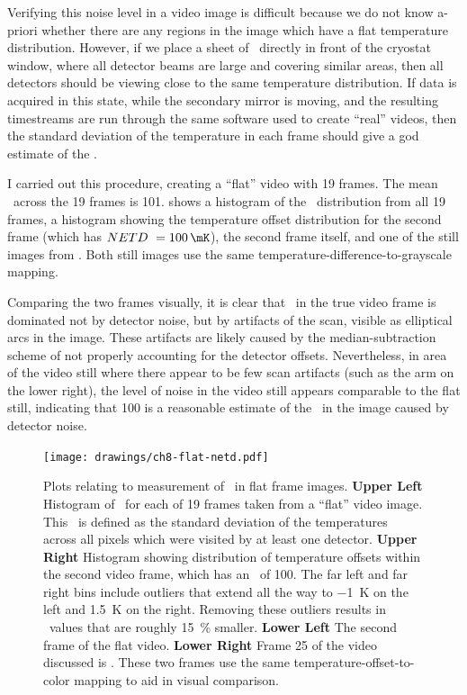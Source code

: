 Verifying this noise level in a video image is difficult because we do not know a-priori whether there are any regions in the image which have a flat temperature distribution.
However, if we place a sheet of \ecco\ directly in front of the cryostat window, where all detector beams are large and covering similar areas, then all detectors should be viewing close to the same temperature distribution.
If data is acquired in this state, while the secondary mirror is moving, and the resulting timestreams are run through the same software used to create ``real'' videos, then the standard deviation of the temperature in each frame should give a god estimate of the \NETD.

I carried out this procedure, creating a ``flat'' video with 19 frames.
The mean \NETD\ across the 19 frames is \SI{101}{\mK}.
 shows a histogram of the \NETD\ distribution from all 19 frames, a histogram showing the temperature offset distribution for the second frame (which has $\NETD\ = \SI{100}{\mK}$), the second frame itself, and one of the still images from .
Both still images use the same temperature-difference-to-grayscale mapping.

Comparing the two frames visually, it is clear that \NETD\ in the true video frame is dominated not by detector noise, but by artifacts of the scan, visible as elliptical arcs in the image.
These artifacts are likely caused by the median-subtraction scheme of  not properly accounting for the detector offsets.
Nevertheless, in area of the video still where there appear to be few scan artifacts (such as the arm on the lower right), the level of noise in the video still appears comparable to the flat still, indicating that \SI{100}{\mK} is a reasonable estimate of the \NETD\ in the image caused by detector noise.

\begin{figure}[th]
\centering
\texttt{[image: drawings/ch8-flat-netd.pdf]}
\caption{
  Plots relating to measurement of \NETD\ in flat frame images.
  \textbf{Upper Left} Histogram of \NETD\ for each of 19 frames taken from a ``flat'' video image. This \NETD\ is defined as the standard deviation of the temperatures across all pixels which were visited by at least one detector. 
  \textbf{Upper Right} Histogram showing distribution of temperature offsets within the second video frame, which has an \NETD\ of \SI{100}{\mK}.
                       The far left and far right bins include outliers that extend all the way to \SI{-1}{\K} on the left and \SI{1.5}{\K} on the right.
                       Removing these outliers results in \NETD\ values that are roughly \SI{15}{\percent} smaller.
  \textbf{Lower Left} The second frame of the flat video.
  \textbf{Lower Right} Frame 25 of the video discussed is .
These two frames use the same temperature-offset-to-color mapping to aid in visual comparison.
}
\label{fig:ch8-flat-netd}
\end{figure}

